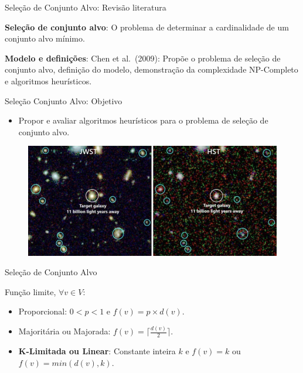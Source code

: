 \documentclass{beamer}
\begin{document}



\begin{frame}{Seleção de Conjunto Alvo: Revisão literatura}

\textbf{Seleção de conjunto alvo}: O problema de determinar a
cardinalidade de um conjunto alvo mínimo.\vspace{0.3cm}


\textbf{Modelo e definições}: Chen et al.~(2009): Propõe
o problema de seleção de conjunto alvo, definição do modelo,
demonstração da complexidade NP-Completo e algoritmos heurísticos.
\end{frame}

\begin{frame}{Seleção Conjunto Alvo: Objetivo}
\begin{itemize}
  \item
   Propor e avaliar algoritmos heurísticos para o problema de seleção de conjunto alvo.    
\end{itemize}
\pause
\begin{figure}
\centering
\includegraphics[scale=0.4]{targetGalaxy.png}
\end{figure}
\end{frame}


\begin{frame}{Seleção de Conjunto Alvo}


Função limite, \(\forall v\in V\):

\begin{itemize}
\tightlist
\item
  Proporcional: \(0<p<1\) e \(f(v)=p\times d(v)\).
\item
  Majoritária ou Majorada: \(f(v)=\lceil\frac{d(v)}{2}\rceil\).
\item
  {\bf K-Limitada ou Linear}: Constante inteira \(k\) e \(f(v)=k\) ou
  \(f(v)=min(d(v),k)\).
\end{itemize}
\end{frame}
\end{document}
